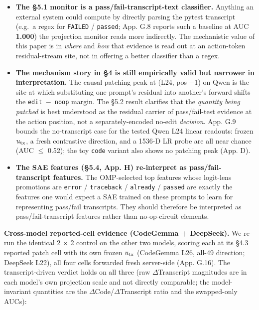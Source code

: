 \documentclass[
  11pt,
  a4paper]{article}
\providecommand{\tightlist}{%
  \setlength{\itemsep}{0pt}\setlength{\parskip}{0pt}}
\begin{document}
\begin{itemize}
\tightlist
\item
  \textbf{The \S{}5.1 monitor is a pass/fail-transcript-text classifier.}
  Anything an external system could compute by directly parsing the
  pytest transcript (e.g.~a regex for \texttt{FAILED} / \texttt{passed};
  App. G.8 reports such a baseline at AUC \textbf{1.000}) the projection
  monitor reads more indirectly. The mechanistic value of this paper is
  in \emph{where} and \emph{how} that evidence is read out at an
  action-token residual-stream site, not in offering a better classifier
  than a regex.
\item
  \textbf{The mechanism story in \S{}4 is still empirically valid but
  narrower in interpretation.} The causal patching peak at (L24, pos \ensuremath{-}1)
  on Qwen is the site at which substituting one prompt's residual into
  another's forward shifts the \texttt{edit\ \ensuremath{-}\ noop} margin. The \S{}5.2
  result clarifies that the \emph{quantity being patched} is best
  understood as the residual carrier of pass/fail-test evidence at the
  action position, not a separately-encoded no-edit \emph{decision}.
  App. G.9 bounds the no-transcript case for the tested Qwen L24 linear
  readouts: frozen \(u_{\rm tx}\), a fresh contrastive direction, and a
  1536-D LR probe are all near chance (AUC \ensuremath{\leq} 0.52); the toy
  \texttt{code} variant also shows no patching peak (App. D).
\item
  \textbf{The SAE features (\S{}5.4, App. H) re-interpret as
  pass/fail-transcript features.} The OMP-selected top features whose
  logit-lens promotions are \texttt{error} / \texttt{traceback} /
  \texttt{already} / \texttt{passed} are exactly the features one would
  expect a SAE trained on these prompts to learn for representing
  pass/fail transcripts. They should therefore be interpreted as
  pass/fail-transcript features rather than no-op-circuit elements.
\end{itemize}

\textbf{Cross-model reported-cell evidence (CodeGemma + DeepSeek).} We
re-run the identical 2 \ensuremath{\times} 2 control on the other two models, scoring each
at its \S{}4.3 reported patch cell with its own frozen \(u_{\rm tx}\)
(CodeGemma L26, all-49 direction; DeepSeek L22), all four cells
forwarded fresh server-side (App. G.16). The transcript-driven verdict
holds on all three (raw \ensuremath{\Delta}Transcript magnitudes are in each model's own
projection scale and not directly comparable; the model-invariant
quantities are the \textbar \ensuremath{\Delta}Code\textbar/\textbar \ensuremath{\Delta}Transcript\textbar{}
ratio and the swapped-only AUCs):
\end{document}
